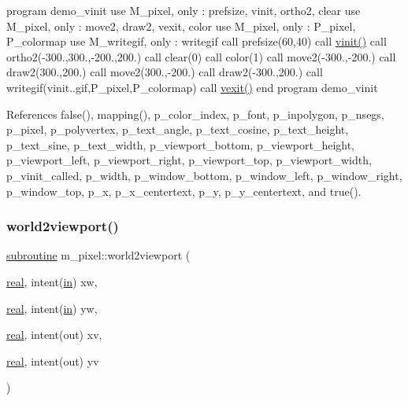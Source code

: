 program demo\+\_\+vinit use M\+\_\+pixel, only \+: prefsize, vinit, ortho2, clear use M\+\_\+pixel, only \+: move2, draw2, vexit, color use M\+\_\+pixel, only \+: P\+\_\+pixel, P\+\_\+colormap use M\+\_\+writegif, only \+: writegif call prefsize(60,40) call \hyperlink{namespacem__pixel_ac03ca8f23fdadb60599b6ea4dc87a6d9}{vinit()} call ortho2(-\/300.,300.,-\/200.,200.) call clear(0) call color(1) call move2(-\/300.,-\/200.) call draw2(300.,200.) call move2(300.,-\/200.) call draw2(-\/300.,200.) call writegif(\textquotesingle{}vinit..\+gif\textquotesingle{},P\+\_\+pixel,P\+\_\+colormap) call \hyperlink{namespacem__pixel_a19ad6b65752322b0029a62cc0ebec3e8}{vexit()} end program demo\+\_\+vinit 

References false(), mapping(), p\+\_\+color\+\_\+index, p\+\_\+font, p\+\_\+inpolygon, p\+\_\+nsegs, p\+\_\+pixel, p\+\_\+polyvertex, p\+\_\+text\+\_\+angle, p\+\_\+text\+\_\+cosine, p\+\_\+text\+\_\+height, p\+\_\+text\+\_\+sine, p\+\_\+text\+\_\+width, p\+\_\+viewport\+\_\+bottom, p\+\_\+viewport\+\_\+height, p\+\_\+viewport\+\_\+left, p\+\_\+viewport\+\_\+right, p\+\_\+viewport\+\_\+top, p\+\_\+viewport\+\_\+width, p\+\_\+vinit\+\_\+called, p\+\_\+width, p\+\_\+window\+\_\+bottom, p\+\_\+window\+\_\+left, p\+\_\+window\+\_\+right, p\+\_\+window\+\_\+top, p\+\_\+x, p\+\_\+x\+\_\+centertext, p\+\_\+y, p\+\_\+y\+\_\+centertext, and true().

\mbox{\label{namespacem__pixel_a9d4aea8ae2eb15317b83fa03a11371b2}} 
\subsubsection{\texorpdfstring{world2viewport()}{world2viewport()}}
{\footnotesize\ttfamily \hyperlink{M__stopwatch_83_8txt_acfbcff50169d691ff02d4a123ed70482}{subroutine} m\+\_\+pixel\+::world2viewport (\begin{DoxyParamCaption}\item[{\hyperlink{read__watch_83_8txt_abdb62bde002f38ef75f810d3a905a823}{real}, intent(\hyperlink{M__journal_83_8txt_afce72651d1eed785a2132bee863b2f38}{in})}]{xw,  }\item[{\hyperlink{read__watch_83_8txt_abdb62bde002f38ef75f810d3a905a823}{real}, intent(\hyperlink{M__journal_83_8txt_afce72651d1eed785a2132bee863b2f38}{in})}]{yw,  }\item[{\hyperlink{read__watch_83_8txt_abdb62bde002f38ef75f810d3a905a823}{real}, intent(out)}]{xv,  }\item[{\hyperlink{read__watch_83_8txt_abdb62bde002f38ef75f810d3a905a823}{real}, intent(out)}]{yv }\end{DoxyParamCaption})}



